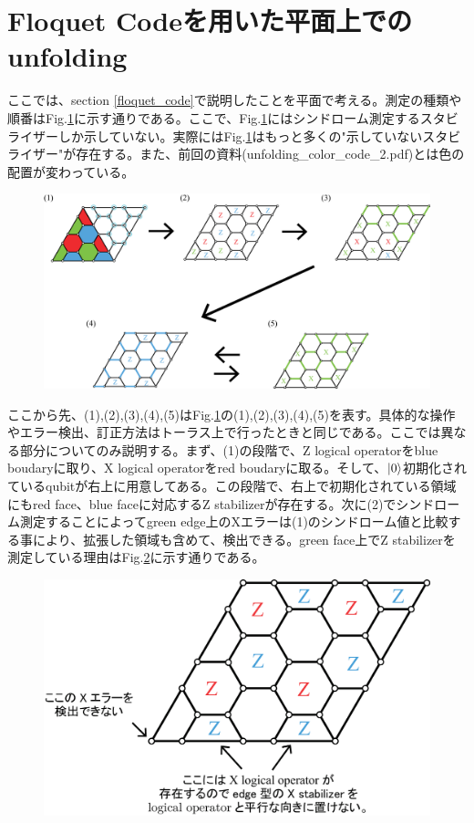 \documentclass[a4paper,10pt]{ltjsarticle}
\begin{document}
\section{Floquet Codeを用いた平面上でのunfolding}{
    ここでは、section \ref{floquet_code}で説明したことを平面で考える。測定の種類や順番はFig.\ref{figure7}に示す通りである。ここで、Fig.\ref{figure7}にはシンドローム測定するスタビライザーしか示していない。実際にはFig.\ref{figure7}はもっと多くの"示していないスタビライザー"が存在する。また、前回の資料(unfolding\_color\_code\_2.pdf)とは色の配置が変わっている。

    \begin{figure}[h]
        \centering
        \includegraphics[scale=0.3]{figure/figure7.eps}
        \caption{ }
        \label{figure7}
    \end{figure}

    ここから先、(1),(2),(3),(4),(5)はFig.\ref{figure7}の(1),(2),(3),(4),(5)を表す。具体的な操作やエラー検出、訂正方法はトーラス上で行ったときと同じである。ここでは異なる部分についてのみ説明する。まず、(1)の段階で、Z logical operatorをblue boudaryに取り、X logical operatorをred boudaryに取る。そして、$\ket{0}$初期化されているqubitが右上に用意してある。この段階で、右上で初期化されている領域にもred face、blue faceに対応するZ stabilizerが存在する。次に(2)でシンドローム測定することによってgreen edge上のXエラーは(1)のシンドローム値と比較する事により、拡張した領域も含めて、検出できる。green face上でZ stabilizerを測定している理由はFig.\ref{figure8}に示す通りである。

    \begin{figure}[h]
        \centering
        \includegraphics[scale=0.2]{figure/figure8.eps}
        \caption{ }
        \label{figure8}
    \end{figure}

}
\end{document}
